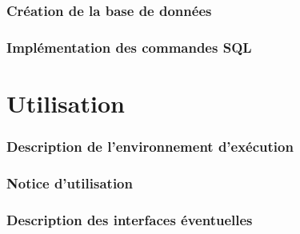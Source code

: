 \documentclass[a4paper, 11pt]{article}
\begin{document}
\section{Création de la base de données}
\section{Implémentation des commandes SQL}
\newpage
\part{Utilisation}
\setcounter{section}{0}
\section{Description de l'environnement d'exécution}
\section{Notice d'utilisation}
\section{Description des interfaces éventuelles}
\end{document}
